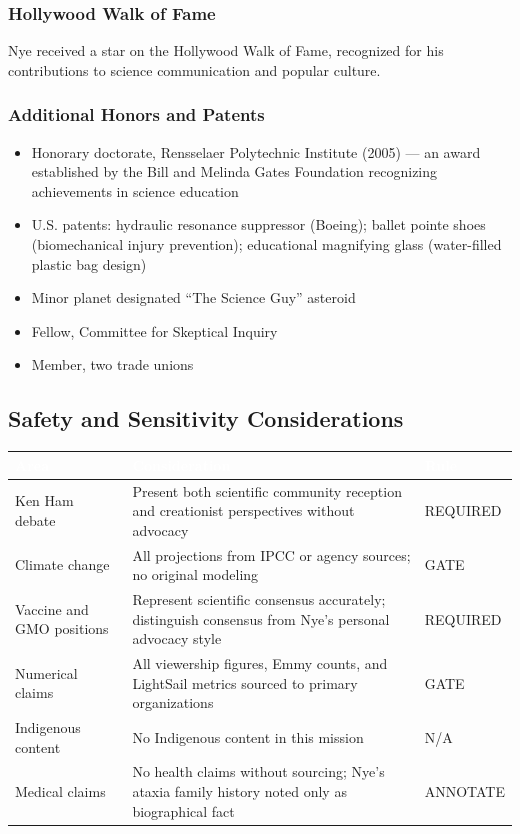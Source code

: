 \documentclass[11pt,letterpaper]{article}
\newcommand{\tableheader}[1]{\textbf{\sffamily\textcolor{white}{#1}}}
\begin{document}
\subsubsection{Hollywood Walk of Fame}

Nye received a star on the Hollywood Walk of Fame, recognized for his contributions to science communication and popular culture.

\subsubsection{Additional Honors and Patents}

\begin{itemize}[leftmargin=*]
  \item Honorary doctorate, Rensselaer Polytechnic Institute (2005) --- an award established by the Bill and Melinda Gates Foundation recognizing achievements in science education
  \item U.S. patents: hydraulic resonance suppressor (Boeing); ballet pointe shoes (biomechanical injury prevention); educational magnifying glass (water-filled plastic bag design)
  \item Minor planet designated ``The Science Guy'' asteroid
  \item Fellow, Committee for Skeptical Inquiry
  \item Member, two trade unions
\end{itemize}

\subsection{Safety and Sensitivity Considerations}

\begin{center}
\begin{tabularx}{\textwidth}{L{3.5cm}XC{2.5cm}}
\toprule
{}
\tableheader{Area} & \tableheader{Consideration} & \tableheader{Rule} \\
\midrule
Ken Ham debate & Present both scientific community reception and creationist perspectives without advocacy & REQUIRED \\
Climate change & All projections from IPCC or agency sources; no original modeling & GATE \\
Vaccine and GMO positions & Represent scientific consensus accurately; distinguish consensus from Nye's personal advocacy style & REQUIRED \\
Numerical claims & All viewership figures, Emmy counts, and LightSail metrics sourced to primary organizations & GATE \\
Indigenous content & No Indigenous content in this mission & N/A \\
Medical claims & No health claims without sourcing; Nye's ataxia family history noted only as biographical fact & ANNOTATE \\
\bottomrule
\end{tabularx}
\end{center}
\end{document}
